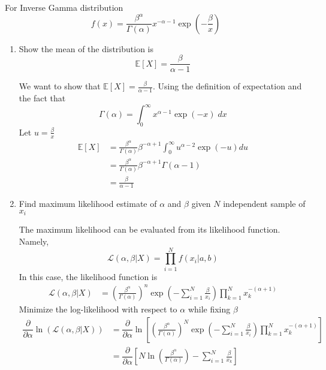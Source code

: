 \documentclass{article}
\begin{document}
For Inverse Gamma distribution 
$$f(x) = \frac{\beta^\alpha}{\Gamma(\alpha)} x^{-\alpha-1}\exp\left(-\frac{\beta}{x}\right)$$
\begin{enumerate}
    \item Show the mean of the distribution is
    $$\mathbb{E}[X] = \frac{\beta}{\alpha - 1}$$
    \color{blue}
    \begin{sol}
    We want to show that $\mathbb{E}[X] = \frac{\beta}{\alpha - 1}$. Using the definition of expectation and the fact that 
    \begin{equation}
            \Gamma(\alpha) = \int_0^{\infty} x^{\alpha-1} \exp(-x) \; dx 
    \end{equation}
    Let $u = \frac{\beta}{x}$
    \begin{align*}
        \mathbb{E}[X] &= \frac{\beta^\alpha}{\Gamma(\alpha)}\beta^{-\alpha +1}\int_{0}^{\infty} u^{\alpha - 2}\exp(-u) du \\
        & = \frac{\beta^\alpha}{\Gamma(\alpha)}\beta^{-\alpha + 1}\Gamma(\alpha-1) \\
        & = \frac{\beta}{\alpha - 1}
    \end{align*}
    \end{sol}
    \color{black}
    \item Find maximum likelihood estimate of $\alpha$ and $\beta$ given $N$ independent sample of $x_i$
    \color{blue}
    \begin{sol}
        The maximum likelihood can be evaluated from its likelihood function. Namely,
    \begin{equation}
        \mathcal{L}(\alpha,\beta|X) = \prod_{i=1}^{N} f(x_i|a,b)
    \end{equation}
    In this case, the likelihood function is
    \begin{align*}
        \mathcal{L}(\alpha,\beta|X) &= \left(\frac{\beta^{\alpha}}{\Gamma(\alpha)}\right)^n\exp\left(-\sum_{i=1}^N\frac{\beta}{x_i}\right) \prod_{k=1}^{N}x^{-(\alpha+1)}_k 
    \end{align*}
    Minimize the log-likelihood with respect to $\alpha$ while fixing $\beta$ 
        \begin{align*}
        \dfrac{\partial}{\partial \alpha}\ln\left(\mathcal{L}(\alpha,\beta|X)\right) &= \dfrac{\partial}{\partial \alpha}\ln\left[\left(\frac{\beta^{\alpha}}{\Gamma(\alpha)}\right)^N\exp\left(-\sum_{i=1}^N\frac{\beta}{x_i}\right) \prod_{k=1}^{N}x^{-(\alpha+1)}_k\right]\\
        &=\dfrac{\partial}{\partial \alpha} \left[N\ln\left(\frac{\beta^{\alpha}}{\Gamma(\alpha)}\right) -\sum_{i=1}^{N}\frac{\beta}{x_k}\right]

\end{align*}
\end{sol}
\end{enumerate}
\end{document}
